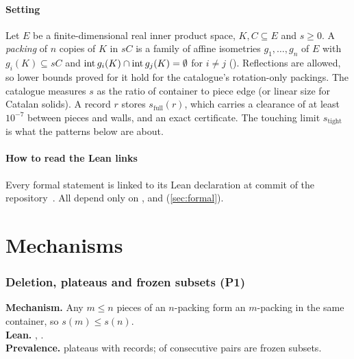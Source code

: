 \documentclass[11pt,a4paper]{article}
\begin{document}
\subsection{Setting}
Let $E$ be a finite-dimensional real inner product space, $K,C\subseteq E$ and $s\ge 0$. A \emph{packing} of $n$ copies of $K$ in $sC$ is a family of affine isometries $g_1,\dots,g_n$ of $E$ with $g_i(K)\subseteq sC$ and $\operatorname{int} g_i(K)\cap\operatorname{int} g_j(K)=\emptyset$ for $i\neq j$ (). Reflections are allowed, so lower bounds proved for it hold for the catalogue's rotation-only packings. The catalogue measures $s$ as the ratio of container to piece edge (or linear size for Catalan solids). A record $r$ stores $s_{\mathrm{full}}(r)$, which carries a clearance of at least $10^{-7}$ between pieces and walls, and an exact certificate. The touching limit $s_{\mathrm{tight}}$ is what the patterns below are about.

\subsection{How to read the Lean links}
Every formal statement is linked to its Lean declaration at commit \href{\repo/tree/\leancommit}{\texttt{\leancommitshort}} of the repository~\cite{archive}. All depend only on ,  and  (\cref{sec:formal}).

\clearpage
\part{Mechanisms}\label{part:mech}

\section{Deletion, plateaus and frozen subsets (P1)}\label{sec:deletion}

\begin{summarybox}
\textbf{Mechanism.} Any $m\le n$ pieces of an $n$-packing form an $m$-packing in the same container, so $s(m)\le s(n)$.\\
\textbf{Lean.} , .\\
\textbf{Prevalence.} \nPlateaus{} plateaus with \nPlateauRecords{} records; \nInhConsFrozen{} of \nInhCons{} consecutive pairs are frozen subsets.
\end{summarybox}
\end{document}
